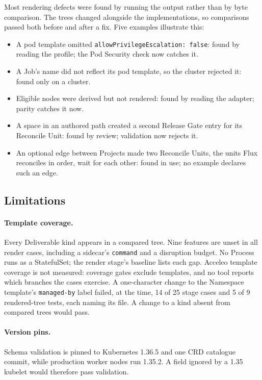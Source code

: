 Most rendering defects were found by running the output rather than by byte comparison. The trees changed alongside the implementations, so comparisons passed both before and after a fix. Five examples illustrate this:
\begin{itemize}
\item A pod template omitted \texttt{allowPrivilegeEscalation: false}: found by
  reading the profile; the Pod Security check now catches it.
\item A Job's name did not reflect its pod template, so the cluster rejected it: found only on a cluster.
\item Eligible nodes were derived but not rendered: found by reading the adapter;
  parity catches it now.
\item A space in an authored path created a second Release Gate entry for its
  Reconcile Unit: found by review; validation now rejects it.
\item An optional edge between Projects made two Reconcile Units, the units Flux
  reconciles in order, wait for each other: found in use; no example declares such an edge.
\end{itemize}

\subsection{Limitations}
\label{sec:limitations}

\paragraph{Template coverage.} Every Deliverable kind appears in a compared tree. Nine features are unset in all render cases, including a sidecar's \texttt{command} and a disruption budget. No Process runs as a StatefulSet; the render stage's baseline lists each gap.
Acceleo template coverage is not measured: coverage gates exclude templates, and no
tool reports which branches the cases exercise. A one-character change to the Namespace
template's \texttt{managed-by} label failed, at the time, 14 of 25 stage cases and 5 of 9 rendered-tree tests, each naming its file. A change to a kind absent from compared trees would pass.

\paragraph{Version pins.} Schema validation is pinned to Kubernetes 1.36.5 and one
CRD catalogue commit, while production worker nodes run 1.35.2. A field ignored by a
1.35 kubelet would therefore pass validation.

